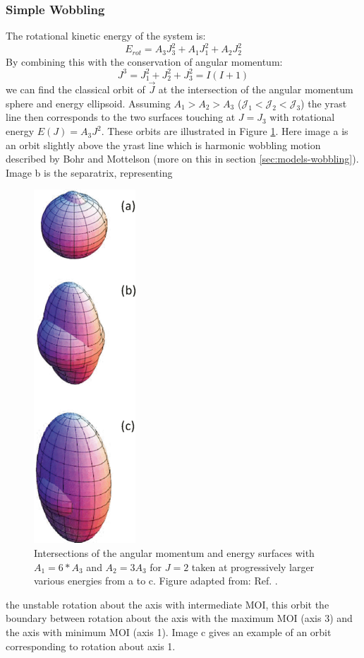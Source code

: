 \subsubsection{Simple Wobbling}
\label{ssec:models-simple-wobbling}
The rotational kinetic energy of the system is:
\begin{equation}
\label{eqn:chp2-rot-kin-en}
E_{rot} = A_3J_3^2 + A_1J_1^2 + A_2J_2^2
\end{equation}
By combining this with the conservation of angular momentum:
\begin{equation}
\label{eqn:chp2-am-cons}
J^3 = J_1^2 + J_2^2 + J_3^2 = I(I+1)
\end{equation}
we can find the classical orbit of $\vec{J}$ at the intersection of the angular momentum sphere and energy ellipsoid. Assuming $A_1>A_2>A_3$ ($\mathcal{J}_1<\mathcal{J}_2<\mathcal{J}_3$) the yrast line then corresponds to the two surfaces touching at $J=J_3$ with rotational energy $E(J)=A_3J^2$. These orbits are illustrated in Figure \ref{fig:chp2-classical-am-orbits}. Here image a is an orbit slightly above the yrast line which is harmonic wobbling motion described by Bohr and Mottelson \cite{bohrMottelson2} (more on this in section \ref{sec:models-wobbling}). Image b is the separatrix, representing
\begin{figure}[t!]
\centerline{\includegraphics[height=0.25\textheight]{./img/c2/simple_am_orbits.png}}
	\caption{Intersections of the angular momentum and energy surfaces with $A_1=6*A_3$ and $A_2=3A_3$ for $J=2$ taken at progressively larger various energies from a to c. Figure adapted from: Ref. \cite{frauendorfTransverseWobbling}.\label{fig:chp2-classical-am-orbits}}
\end{figure} the unstable rotation about the axis with intermediate MOI, this orbit the boundary between rotation about the axis with the maximum MOI (axis 3) and the axis with minimum MOI (axis 1). Image c gives an example of an orbit corresponding to rotation about axis 1.

